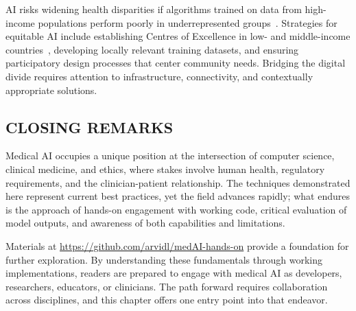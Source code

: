 \documentclass[krantz2,ChapterTOCs]{krantz}
\begin{document}
\begin{description}[style=nextline, leftmargin=1em, labelindent=0pt, itemsep=0.2ex]
\item[Global health equity]
AI risks widening health disparities if algorithms trained on data from high-income populations perform poorly in underrepresented groups~\citep{dychiao2024aihealthequity}.
Strategies for equitable AI include establishing Centres of Excellence in low- and middle-income countries~\citep{akbarialiabad2024lmicai}, developing locally relevant training datasets, and ensuring participatory design processes that center community needs.
Bridging the digital divide requires attention to infrastructure, connectivity, and contextually appropriate solutions.
\end{description}

\subsection{CLOSING REMARKS}

Medical AI occupies a unique position at the intersection of computer science, clinical medicine, and ethics, where stakes involve human health, regulatory requirements, and the clinician-patient relationship.
The techniques demonstrated here represent current best practices, yet the field advances rapidly; what endures is the approach of hands-on engagement with working code, critical evaluation of model outputs, and awareness of both capabilities and limitations.

Materials at \url{https://github.com/arvidl/medAI-hands-on} provide a foundation for further exploration.
By understanding these fundamentals through working implementations, readers are prepared to engage with medical AI as developers, researchers, educators, or clinicians.
The path forward requires collaboration across disciplines, and this chapter offers one entry point into that endeavor.



{\footnotesize


}
\end{document}
